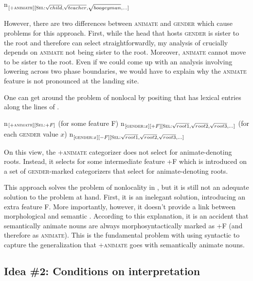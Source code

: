 \documentclass[output=paper,newtxmath,modfonts,nonflat,hidelinks]{langsci/langscibook}
\begin{document}
\ea\label{ex:pesetsky:optiona}  n$_{[+\textsc{animate}][\textsc{Sel}: \sqrt{child}, \sqrt{teacher}, \sqrt{boogeyman}, ...]}$  \z

However, there are two differences between \textsc{animate} and \textsc{gender} which cause problems for this approach.  First, while the head that hosts \textsc{gender} is sister to the root and therefore can select straightforwardly, my analysis of  crucially depends on \textsc{animate} not being sister to the root.  Moreover, \textsc{animate} cannot move to be sister to the root.  Even if we could come up with an analysis involving lowering across two phase boundaries, we would have to explain why the \textsc{animate} feature is not pronounced at the landing site.

One can get around the problem of nonlocal  by positing that  has lexical entries along the lines of .

\ea\label{ex:pesetsky:optionb} \ea n$_{[+\textsc{animate}][\textsc{Sel}:+F]}$ (for some feature F) 
\ex  n$_{[\textsc{gender}:x][+F][\textsc{Sel}: \sqrt{root1}, \sqrt{root2}, \sqrt{root3}, ...]}$ (for each \textsc{gender} value $x$) 
\ex n$_{[\textsc{gender}:x][-F][\textsc{Sel}: \sqrt{root1}, \sqrt{root2}, \sqrt{root3}, ...]}$ \\ \z \z

On this view, the +\textsc{animate} categorizer does not select for animate-denoting roots.  Instead, it selects for some intermediate feature +F which is introduced on a set of \textsc{gender}-marked categorizers that select for animate-denoting roots.  

This approach solves the problem of nonlocality in , but it is still not an adequate solution to the problem at hand.  First, it is an inelegant solution, introducing an extra feature F.  More importantly, however, it doesn't provide a link between morphological  and semantic . According to this explanation, it is an accident that semantically animate nouns are always morphosyntactically marked as +F (and therefore as \textsc{animate}).  This is the fundamental problem with using syntactic  to capture the generalization that +\textsc{animate} goes with semantically animate nouns.  

\subsection{Idea \#2: Conditions on interpretation} \label{sec:pesetsky:conditiononinterp}
\end{document}
